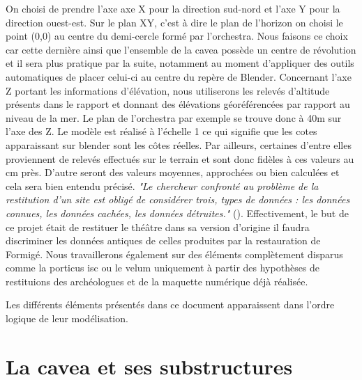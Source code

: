 On choisi de prendre l'axe axe X pour la direction sud-nord et l'axe Y pour la direction ouest-est. Sur le plan XY, c'est à dire le plan de l'horizon on choisi le point (0,0) au centre du demi-cercle formé par l'\gls{orchestra}. Nous faisons ce choix car cette dernière ainsi que l'ensemble de la \gls{cavea} possède un centre de révolution et il sera plus pratique par la suite, notamment au moment d'appliquer des outils automatiques de placer celui-ci au centre du repère de Blender. Concernant l'axe Z portant les informations d'élévation, nous utiliserons les relevés d'altitude présents dans le rapport \cite{orangePl} et donnant des élévations géoréférencées par rapport au niveau de la mer. Le plan de l'\gls{orchestra} par exemple se trouve donc à 40m sur l'axe des Z. Le modèle est réalisé à l'échelle 1 ce qui signifie que les cotes apparaissant sur blender sont les côtes réelles. Par ailleurs, certaines d'entre elles proviennent de relevés effectués sur le terrain et sont donc fidèles à ces valeurs au cm près. D'autre seront des valeurs moyennes, approchées ou bien calculées et cela sera bien entendu précisé. \textit{"Le chercheur confronté au problème de la restitution d’un site est obligé de considérer trois, types de données : les données connues, les données cachées, les données détruites."} (\cite{golvin}). Effectivement, le but de ce projet était de restituer le théâtre dans sa version d'origine il faudra discriminer les données antiques de celles produites par la restauration de Formigé. Nous travaillerons également sur des éléments complètement disparus comme la \gls{porticus isc} ou le velum uniquement à partir des hypothèses de restituions des archéologues et de la maquette numérique déjà réalisée.

Les différents éléments présentés dans ce document apparaissent dans l'ordre logique de leur modélisation.

\section{La cavea et ses substructures}  
	\label{La cavea et ses substructures}


